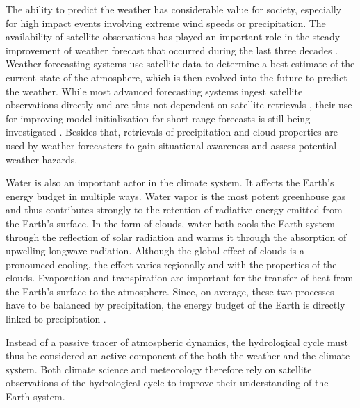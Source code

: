 The ability to predict the weather has considerable value for society,
especially for high impact events involving extreme wind speeds or
precipitation. The availability of satellite observations has played an
important role in the steady improvement of weather forecast that occurred
during the last three decades
\citep{bauer15}. Weather forecasting  systems use satellite data to
determine a best estimate of the current state of the atmosphere, which is then
evolved into the future to predict the weather. While most advanced forecasting
systems ingest satellite observations directly and are thus not dependent on
satellite retrievals \citep{bauer10}, their use for improving model
initialization for short-range forecasts is still being investigated
\citep{dehaan14, benjamin21}. Besides that, retrievals of precipitation and
cloud properties are used by weather forecasters to gain situational awareness
and assess potential weather hazards.


Water is also an important actor in the climate system. It affects the Earth's
energy budget in multiple ways. Water vapor is the most potent greenhouse gas
and thus contributes strongly to the retention of radiative energy emitted from
the Earth's surface. In the form of clouds, water both cools the Earth system
through the reflection of solar radiation and warms it through the absorption of
upwelling longwave radiation. Although the global effect of clouds is a
pronounced cooling, the effect varies regionally and with the properties of the
clouds. Evaporation and transpiration are important for the transfer of heat
from the Earth's surface to the atmosphere. Since, on average, these two processes
have to be balanced by precipitation, the energy budget of the Earth is directly
linked to precipitation \citep{trenberth09}.

Instead of a passive tracer of atmospheric dynamics, the hydrological cycle must
thus be considered an active component of the both the weather and the climate
system. Both climate science and meteorology therefore rely on satellite observations
of the hydrological cycle to improve their understanding of the Earth system.


